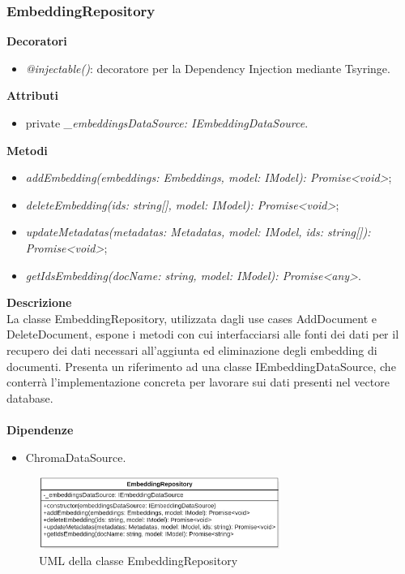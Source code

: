 \subsubsection{EmbeddingRepository}
\textbf{Decoratori}
\begin{itemize}
    \item \textit{@injectable()}: decoratore per la Dependency Injection mediante Tsyringe.
\end{itemize}
\textbf{Attributi}
\begin{itemize}
    \item private \textit{\_embeddingsDataSource: IEmbeddingDataSource}.
\end{itemize}
\textbf{Metodi}
\begin{itemize}[itemsep=-4pt]
    \item \textit{addEmbedding(embeddings: Embeddings, model: IModel): Promise<void>};
    \item \textit{deleteEmbedding(ids: string[], model: IModel): Promise<void>};
    \item \textit{updateMetadatas(metadatas: Metadatas, model: IModel, ids: string[]): Promise<void>};
    \item \textit{getIdsEmbedding(docName: string, model: IModel): Promise<any>}.
\end{itemize}
\textbf{Descrizione}\\
La classe EmbeddingRepository, utilizzata dagli use cases AddDocument e DeleteDocument, espone i metodi con cui interfacciarsi alle fonti dei dati per il recupero dei dati necessari all'aggiunta ed eliminazione degli embedding di documenti. Presenta un riferimento ad una classe IEmbeddingDataSource, che conterrà l'implementazione concreta per lavorare sui dati presenti nel vectore database.\\ \\
\textbf{Dipendenze}
\begin{itemize}
    \item ChromaDataSource.
\end{itemize}

\begin{figure}[h!]
    \centering  
    \includegraphics[width=0.7\textwidth]{EmbeddingRepository.png}
    \caption{UML della classe EmbeddingRepository}
\end{figure}

